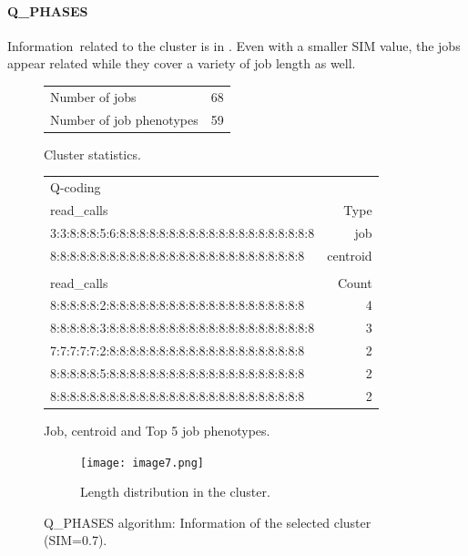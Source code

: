 \documentclass{jhps}
\begin{document}
\FloatBarrier
\paragraph{Q\_PHASES}
Information\ related to the cluster is in .
Even with a smaller SIM value, the jobs appear related while they cover a variety of job length as well.

\begin{figure}
	\begin{subtable}{\textwidth}
		\centering
		\begin{tabular}{ll}
			Number of jobs      & 68  \\
			Number of job phenotypes & 59  \\
		\end{tabular}
		\caption{Cluster statistics.}
		\label{cluster:use_case:pm_quant:stats}
	\end{subtable}
	\medskip
	\begin{subtable}{\textwidth}
		\centering
		\begin{tiny}
			\begin{tabular}{l|r}
				\rowcolor{tblhead}
				Q-coding & \\
				\rowcolor{tblhead}
				read\_calls                                           & Type     \\
				\hline
				3:3:8:8:8:5:6:8:8:8:8:8:8:8:8:8:8:8:8:8:8:8:8:8:8:8:8 & job      \\
				8:8:8:8:8:8:8:8:8:8:8:8:8:8:8:8:8:8:8:8:8:8:8:8:8:8   & centroid \\
				\multicolumn{2}{l}{}\\
				\rowcolor{tblhead}
				read\_calls                                           & Count    \\
				\hline
				8:8:8:8:8:2:8:8:8:8:8:8:8:8:8:8:8:8:8:8:8:8:8:8:8:8   & 4        \\
				8:8:8:8:8:3:8:8:8:8:8:8:8:8:8:8:8:8:8:8:8:8:8:8:8:8:8 & 3        \\
				7:7:7:7:7:2:8:8:8:8:8:8:8:8:8:8:8:8:8:8:8:8:8:8:8:8   & 2        \\
				8:8:8:8:8:5:8:8:8:8:8:8:8:8:8:8:8:8:8:8:8:8:8:8:8:8   & 2        \\
				8:8:8:8:8:8:8:8:8:8:8:8:8:8:8:8:8:8:8:8:8:8:8:8:8:8   & 2        \\
			\end{tabular}
		\end{tiny}
		\caption{Job, centroid and Top 5 job phenotypes.}
		\label{cluster:use_case:pm_quant:top_jobs}
	\end{subtable}
	\medskip
	\begin{subfigure}{\textwidth}
		\centering
		\texttt{[image: image7.png]}
		\caption{Length distribution in the cluster.}
		\label{cluster:use_case:pm_quant:length}
	\end{subfigure}
	\caption{Q\_PHASES algorithm: Information of the selected cluster (SIM=0.7).}
	\label{cluster:use_case:pm_quant}
\end{figure}
\end{document}
